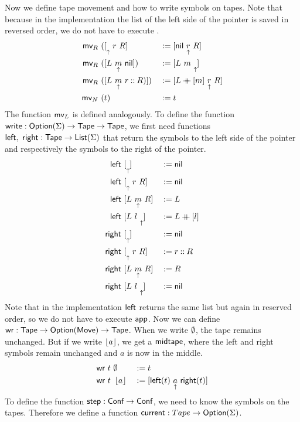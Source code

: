 \documentclass{psartcl}
\begin{document}
Now we define tape movement and how to write symbols on tapes.  Note that because in the implementation the list of the left side of the pointer is
saved in reversed order, we do not have to execute .  \begin{alignat*}{2}
  \textsf{mv}_R&~([ \underset{\uparrow}{}~r~R ]               &&:= [ \textsf{nil}~\underset{\uparrow}{r}~R ] \\
  \textsf{mv}_R&~([ L~\underset{\uparrow}{m}~\textsf{nil} ])       &&:= [ L~m~\underset{\uparrow}{} ] \\
  \textsf{mv}_R&~([ L~\underset{\uparrow}{m}~r \mathbin{::} R) ]) &&:= [ L \mathbin{+\mkern-10mu+} [m]~\underset{\uparrow}{r}~R ] \\
  \textsf{mv}_N&~(t)                          &&:= t
\end{alignat*}
The function $\textsf{mv}_L$ is defined analogously.
To define the function $\textsf{write} : \textsf{Option}(\Sigma) \rightarrow \textsf{Tape} \rightarrow \textsf{Tape}$, we first need functions
$\textsf{left},~\textsf{right} : \textsf{Tape} \rightarrow \textsf{List}(\Sigma)$
that return the symbols to the left side of the pointer and respectively the symbols to the right of the pointer.
\begin{alignat*}{2}
  \textsf{left} &~[ \underset{\uparrow}{} ]          &&:= \textsf{nil} \\
  \textsf{left} &~[ \underset{\uparrow}{}~r~R ]     &&:= \textsf{nil} \\
  \textsf{left} &~[ L~\underset{\uparrow}{m}~R ] &&:= L \\
  \textsf{left} &~[ L~l~\underset{\uparrow}{} ]    &&:= L \mathbin{+\mkern-10mu+} [l] \\
  \textsf{right}&~[ \underset{\uparrow}{} ]          &&:= \textsf{nil} \\
  \textsf{right}&~[ \underset{\uparrow}{}~r~R ]     &&:= r \mathbin{::} R \\
  \textsf{right}&~[ L~\underset{\uparrow}{m}~R ] &&:= R \\
  \textsf{right}&~[ L~l~\underset{\uparrow}{} ]    &&:= \textsf{nil}
\end{alignat*}
Note that in the implementation $\textsf{left}$ returns the same list but again in reserved order, so we do not have to execute $\textsf{app}$.
Now we can define $\textsf{wr} : \textsf{Tape} \rightarrow \textsf{Option}(\textsf{Move}) \rightarrow \textsf{Tape}$.
When we write $\emptyset$, the tape remains unchanged.
But if we write $\left\lfloor {a}\right\rfloor$, we get a $\textsf{midtape}$, where the left and right symbols remain unchanged and $a$ is now in the middle.
\begin{alignat*}{3}
  \textsf{wr}~t &~ \emptyset   &&:= t \\
  \textsf{wr}~t &~ \left\lfloor {a}\right\rfloor &&:= [ \textsf{left}(t)~\underset{\uparrow}{a}~\textsf{right}(t) ]
\end{alignat*}
To define the function $\textsf{step} : \textsf{Conf} \rightarrow \textsf{Conf}$, we need to know the symbols on the tapes.
Therefore we define a function $\textsf{current} : Tape \rightarrow \textsf{Option}(\Sigma)$.
\end{document}
